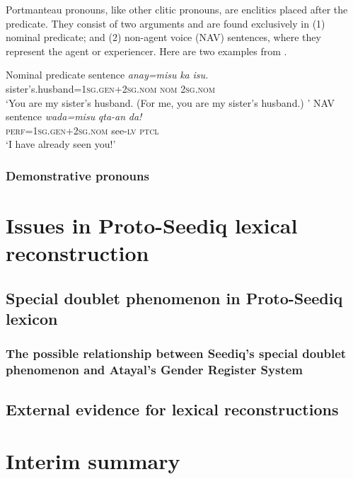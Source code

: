 Portmanteau pronouns, like other clitic pronouns, are enclitics placed after the predicate. They consist of two arguments and are found exclusively in (1) nominal predicate; and (2) non-agent voice (NAV) sentences, where they represent the agent or experiencer. Here are two examples from \textcite[74--75]{Lee2018Trugrammar}.

\begin{exe}

    \ex Nominal predicate sentence
    \gll \textit{anay=misu} \textit{ka} \textit{isu.} \\
    sister's.husband=\textsc{1sg.gen+2sg.nom} \textsc{nom} \textsc{2sg.nom}\\
    \trans `You are my sister's husband. (For me, you are my sister's husband.) '
    \ex NAV sentence
    \gll \textit{wada=misu} \textit{qta-an} \textit{da!} \\
    \textsc{perf}=\textsc{1sg.gen+2sg.nom} see-\textsc{lv} \textsc{ptcl}\\
    \trans `I have already seen you!'
\end{exe}

\subsubsection{Demonstrative pronouns}
\lipsum[1]

\section{Issues in Proto-Seediq lexical reconstruction}
\lipsum[1]

\subsection{Special doublet phenomenon in Proto-Seediq lexicon}
\lipsum[1]

\subsubsection{The possible relationship between Seediq's special doublet phenomenon and Atayal's Gender Register System}
\lipsum[1]

\subsection{External evidence for lexical reconstructions}
\lipsum[1]

\section{Interim summary}
\lipsum[1]